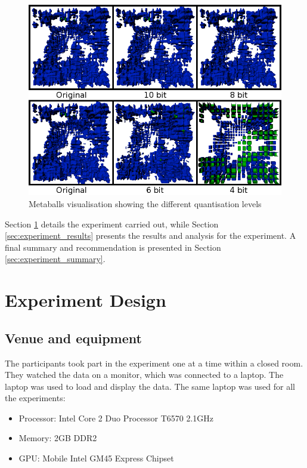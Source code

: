 \begin{figure}[h!]
  \begin{center}
    \includegraphics[width=120mm]{metaballs4680}
  \end{center}
  \caption{Metaballs visualisation showing the different quantisation
  levels}
  \label{fig:experiment_metaballs4680}
\end{figure}

Section \ref{sec:experiment_design} details the experiment carried out, while
Section \ref{sec:experiment_results} presents the results and analysis for the
experiment. A final summary and recommendation is presented in Section
\ref{sec:experiment_summary}.


\section{Experiment Design}
\label{sec:experiment_design}

\subsection{Venue and equipment}
\label{sub:experiment_venue}

The participants took part in the experiment one at a time within a closed
room. They watched the data on a monitor, which was connected to a laptop. The
laptop was used to load and display the data. The same laptop was used for all
the experiments:
\begin{itemize}
  \item Processor: Intel Core 2 Duo Processor T6570 2.1GHz
  \item Memory: 2GB DDR2
  \item GPU: Mobile Intel GM45 Express Chipset
\end{itemize}

